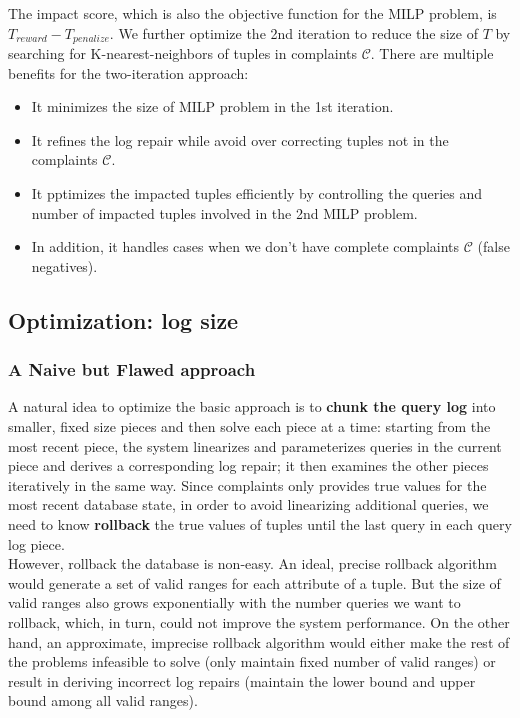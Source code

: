 \smallskip

The impact score, which is also the objective function for
the MILP problem, is $T_{reward} - T_{penalize}$. We further 
optimize the 2nd iteration to reduce the size of $T$ 
by searching for K-nearest-neighbors
of tuples in complaints $\mathcal{C}$. 
There are multiple benefits for the two-iteration approach:
\begin{itemize}
\item It minimizes the size of MILP problem in the 1st iteration. 
\item It refines the log repair while avoid over correcting tuples not in 
the complaints $\mathcal{C}$. 
\item It pptimizes the impacted tuples efficiently by controlling the queries 
and number of impacted tuples
involved in the 2nd MILP problem.
\item In addition, it handles cases when we don't have complete complaints
$\mathcal{C}$ (false negatives). 
\end{itemize}
\subsection{Optimization: log size}


\subsubsection{A Naive but Flawed approach}
A natural idea to optimize the basic approach is 
to \textbf{chunk the query log} into
smaller, fixed size pieces and then solve each piece at a time: starting
from the most recent piece, the system linearizes and parameterizes queries 
in the current piece and derives a corresponding log repair; 
it then examines the other pieces iteratively
in the same way. Since complaints only provides
true values for the most recent database state, in order to avoid 
linearizing additional queries, 
we need to know \textbf{rollback} the true values of tuples 
until the last query in each query log piece. \\
However, rollback the database is non-easy. An ideal, precise rollback
algorithm would generate a set of valid ranges for each attribute of a tuple. 
But the size of valid ranges also grows exponentially with the number queries
we want to rollback, which, in turn, could not improve the system performance. 
On the other hand, an approximate, imprecise 
rollback algorithm would either make the rest of the problems
infeasible to solve (only maintain fixed number of valid ranges) 
or result in deriving 
incorrect log repairs (maintain the lower 
bound and upper bound among all valid ranges).
  

